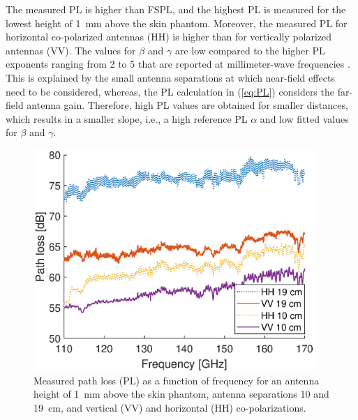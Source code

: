 \documentclass[manuscript]{rsl}
\begin{document}
The measured PL is higher than FSPL, and the highest PL is measured for the lowest height of 1~mm above the skin phantom.
Moreover, the measured PL for horizontal co-polarized antennas (HH) is higher than for vertically polarized antennas (VV).
The values for $\beta$ and $\gamma$ are low compared to the higher PL exponents ranging from 2 to 5 that are reported at millimeter-wave frequencies \cite{Petrillo2014, Aminzadeh2021_tap}. 
This is explained by the small antenna separations at which near-field effects need to be considered, whereas, the PL calculation in (\ref{eq:PL}) considers the far-field antenna gain.
Therefore, high PL values are obtained for smaller distances, which results in a smaller slope, i.e., a high reference PL $\alpha$ and low fitted values for $\beta$ and $\gamma$.

\begin{figure}[t]
\begin{center}
  \includegraphics[width=0.95\textwidth]{figures/PL_vs_freq}
\caption{Measured path loss (PL) as a function of frequency for an antenna height of 1~mm above the skin phantom, antenna separations 10 and 19~cm, and vertical (VV) and horizontal (HH) co-polarizations.}
\label{fig:PL_vs_freq}
\end{center}
\end{figure}
\end{document}

